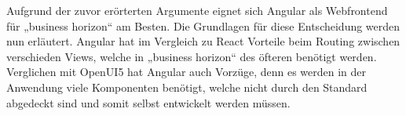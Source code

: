 Aufgrund der zuvor erörterten Argumente eignet sich Angular als Webfrontend für „business horizon“ am Besten. Die Grundlagen für diese Entscheidung werden nun erläutert. Angular hat im Vergleich zu React Vorteile beim Routing zwischen verschieden Views, welche in „business horizon“ des öfteren benötigt werden. Verglichen mit OpenUI5 hat Angular auch Vorzüge, denn es werden in der Anwendung viele Komponenten benötigt, welche nicht durch den Standard abgedeckt sind und somit selbst entwickelt werden müssen.



